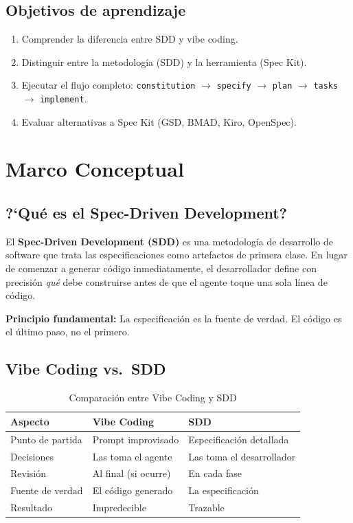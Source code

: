 \documentclass[12pt, a4paper]{report}
\begin{document}
\section{Objetivos de aprendizaje}

\begin{enumerate}[leftmargin=*, label=\arabic{*}.]
  \item Comprender la diferencia entre SDD y vibe coding.
  \item Distinguir entre la metodolog\'ia (SDD) y la herramienta (Spec Kit).
  \item Ejecutar el flujo completo: \texttt{constitution} $\to$
        \texttt{specify} $\to$ \texttt{plan} $\to$ \texttt{tasks}
        $\to$ \texttt{implement}.
  \item Evaluar alternativas a Spec Kit (GSD, BMAD, Kiro, OpenSpec).
\end{enumerate}

\chapter{Marco Conceptual}

\section{?`Qu\'e es el Spec-Driven Development?}

El \textbf{Spec-Driven Development (SDD)} es una metodolog\'ia de desarrollo
de software que trata las especificaciones como artefactos de primera clase.
En lugar de comenzar a generar c\'odigo inmediatamente, el desarrollador
define con precisi\'on \textit{qu\'e} debe construirse antes de que el agente
toque una sola l\'inea de c\'odigo.

\begin{notacaja}
  \textbf{Principio fundamental:} La especificaci\'on es la fuente de verdad.
  El c\'odigo es el \'ultimo paso, no el primero.
\end{notacaja}

\section{Vibe Coding vs.\ SDD}

\begin{table}[H]
\centering
\begin{tabularx}{\textwidth}{lXX}
\toprule
\textbf{Aspecto} & \textbf{Vibe Coding} & \textbf{SDD} \\
\midrule
Punto de partida & Prompt improvisado & Especificaci\'on detallada \\
Decisiones       & Las toma el agente & Las toma el desarrollador \\
Revisi\'on       & Al final (si ocurre) & En cada fase \\
Fuente de verdad & El c\'odigo generado & La especificaci\'on \\
Resultado        & Impredecible & Trazable \\
\bottomrule
\end{tabularx}
\caption{Comparaci\'on entre Vibe Coding y SDD}
\end{table}
\end{document}
